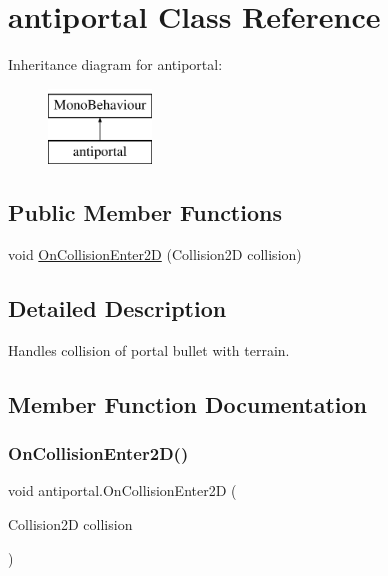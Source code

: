 \hypertarget{classantiportal}{}\section{antiportal Class Reference}
\label{classantiportal}
Inheritance diagram for antiportal\+:\begin{figure}[H]
\begin{center}
\leavevmode
\includegraphics[height=2.000000cm]{classantiportal}
\end{center}
\end{figure}
\subsection*{Public Member Functions}
\begin{DoxyCompactItemize}
\item 
void \mbox{\hyperlink{classantiportal_a77c2fb6ea13c85d2edec17d01f0dfee4}{On\+Collision\+Enter2D}} (Collision2D collision)
\end{DoxyCompactItemize}


\subsection{Detailed Description}
Handles collision of portal bullet with terrain. 

\subsection{Member Function Documentation}
\mbox{\label{classantiportal_a77c2fb6ea13c85d2edec17d01f0dfee4}} 
\subsubsection{\texorpdfstring{On\+Collision\+Enter2\+D()}{OnCollisionEnter2D()}}
{\footnotesize\ttfamily void antiportal.\+On\+Collision\+Enter2D (\begin{DoxyParamCaption}\item[{Collision2D}]{collision }\end{DoxyParamCaption})\hspace{0.3cm}{\ttfamily [inline]}}

